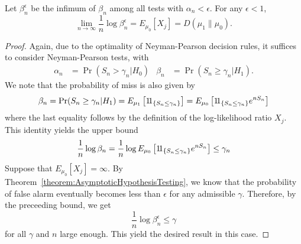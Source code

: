 \begin{theorem}[Stein]
Let $\beta^{\epsilon}_n$ be the infimum of $\beta_n$ among all tests with $\alpha_n < \epsilon$.
For any $\epsilon < 1$,
\begin{equation*}
\lim_{n \rightarrow \infty} \frac{1}{n} \log \beta_n^{\epsilon}
= E_{\mu_0} [ X_j ] = D ( \mu_1 \| \mu_0 ) .
\end{equation*}
\end{theorem}
\begin{proof}
Again, due to the optimality of Neyman-Pearson decision rules, it suffices to consider Neyman-Pearson tests, with
\begin{align*}
\alpha_n &= \Pr (S_n > \gamma_n | H_0) & \beta_n &= \Pr (S_n \geq \gamma_n | H_1) .
\end{align*}
We note that the probability of miss is also given by
\begin{equation*}
\beta_n = \Pr (S_n \geq \gamma_n | H_1)
= E_{\mu_1} \left[ \mathrm{1\!1}_{\{ S_n \leq \gamma_n \}} \right]
= E_{\mu_0} \left[ \mathrm{1\!1}_{\{ S_n \leq \gamma_n \}} e^{n S_n} \right]
\end{equation*}
where the last equality follows by the definition of the log-likelihood ratio $X_j$.
This identity yields the upper bound
\begin{equation*}
\frac{1}{n} \log \beta_n
= \frac{1}{n} \log E_{\mu_0} \left[ \mathrm{1\!1}_{\{ S_n \leq \gamma_n \}} e^{n S_n} \right]
\leq \gamma_n
\end{equation*}
Suppose that $E_{\mu_0} [X_j] = \infty$.
By Theorem~\ref{theorem:AsymptoticHypothesisTesting}, we know that the probability of false alarm eventually becomes less than $\epsilon$ for any admissible $\gamma$.
Therefore, by the preceeding bound, we get
\begin{equation*}
\frac{1}{n} \log \beta_n^{\epsilon} \leq \gamma
\end{equation*}
for all $\gamma$ and $n$ large enough.
This yield the desired result in this case.


\end{proof}
